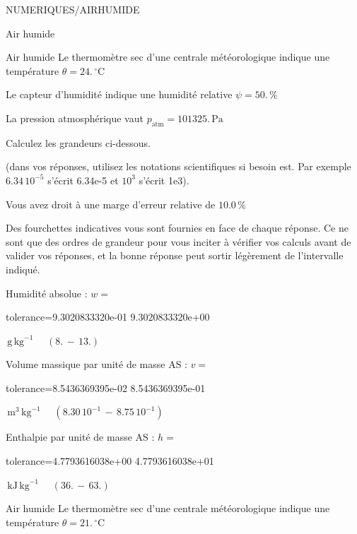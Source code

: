 \documentclass[12pt]{article}
\begin{document}
\begin{quiz}{NUMERIQUES/AIRHUMIDE}
\begin{cloze}{Air humide}
\end{cloze} 


 \begin{cloze}{Air humide} 
Le thermomètre sec d’une centrale météorologique indique une température $\theta = 24.\,  \mathrm{^\circ\mathrm{C}} $

Le capteur d'humidité indique une humidité relative $\psi = 50.\, \% $

La pression atmosphérique vaut $p_{\text{atm}} = 101325.\,  \mathrm{Pa} $

 

Calculez les grandeurs ci-dessous.

(dans vos réponses, utilisez les notations scientifiques si besoin est. Par exemple $6.34\, 10^{-5}$ s'écrit 6.34e-5 et $10^{3}$ s'écrit 1e3).

Vous avez droit à une marge d'erreur relative de $10.0\, \% $

Des fourchettes indicatives vous sont fournies en face de chaque réponse. Ce ne sont que des ordres de grandeur pour vous inciter à vérifier vos calculs avant de valider vos réponses, et la bonne réponse peut sortir légèrement de l'intervalle indiqué.

Humidité absolue : $w =  $
\begin{numerical}[points=1] 
\item[tolerance={9.3020833320e-01}] 9.3020833320e+00 
\end{numerical} 
 $\,  \mathrm{g}\,  \mathrm{kg}^{-1}$ 
 $ \quad (8. \, - \, 13.) $ 

Volume massique par unité de masse AS : $v =  $
\begin{numerical}[points=1] 
\item[tolerance={8.5436369395e-02}] 8.5436369395e-01 
\end{numerical} 
 $\,  \mathrm{m}^{3}\,  \mathrm{kg}^{-1}$ 
 $ \quad ( 8.30 \, 10^{-1}  \, - \,  8.75 \, 10^{-1} ) $ 

Enthalpie par unité de masse AS : $h =  $
\begin{numerical}[points=2] 
\item[tolerance={4.7793616038e+00}] 4.7793616038e+01 
\end{numerical} 
 $\,  \mathrm{kJ}\,  \mathrm{kg}^{-1}$ 
 $ \quad (36. \, - \, 63.) $ 

\end{cloze} 


 \begin{cloze}{Air humide} 
Le thermomètre sec d’une centrale météorologique indique une température $\theta = 21.\,  \mathrm{^\circ\mathrm{C}} $


\end{cloze}
\end{quiz}
\end{document}
